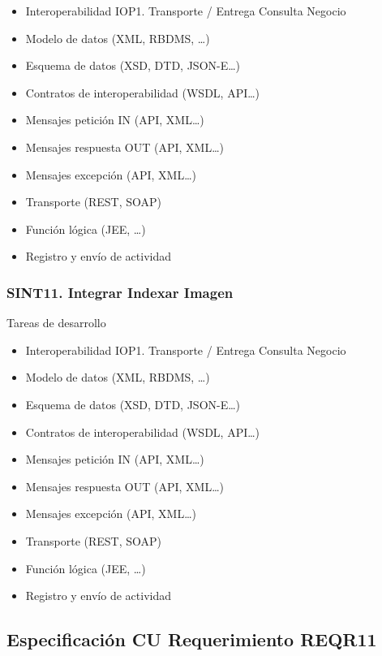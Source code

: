 \documentclass[
  paper=a4,
  ,captions=tableheading
]{scrartcl}
\providecommand{\tightlist}{%
  \setlength{\itemsep}{0pt}\setlength{\parskip}{0pt}}
\begin{document}
\begin{itemize}
\tightlist
\item
  Interoperabilidad IOP1. Transporte / Entrega Consulta Negocio
\item
  Modelo de datos (XML, RBDMS, \ldots)
\item
  Esquema de datos (XSD, DTD, JSON-E\ldots)
\item
  Contratos de interoperabilidad (WSDL, API\ldots)
\item
  Mensajes petición IN (API, XML\ldots)
\item
  Mensajes respuesta OUT (API, XML\ldots)
\item
  Mensajes excepción (API, XML\ldots)
\item
  Transporte (REST, SOAP)
\item
  Función lógica (JEE, \ldots)
\item
  Registro y envío de actividad
\end{itemize}

\subsubsection{SINT11. Integrar Indexar
Imagen}\label{sec:sint11.-integrar-indexar-imagen}

Tareas de desarrollo

\begin{itemize}
\tightlist
\item
  Interoperabilidad IOP1. Transporte / Entrega Consulta Negocio
\item
  Modelo de datos (XML, RBDMS, \ldots)
\item
  Esquema de datos (XSD, DTD, JSON-E\ldots)
\item
  Contratos de interoperabilidad (WSDL, API\ldots)
\item
  Mensajes petición IN (API, XML\ldots)
\item
  Mensajes respuesta OUT (API, XML\ldots)
\item
  Mensajes excepción (API, XML\ldots)
\item
  Transporte (REST, SOAP)
\item
  Función lógica (JEE, \ldots)
\item
  Registro y envío de actividad
\end{itemize}

\subsection{Especificación CU Requerimiento
REQR11}\label{sec:especificaciuxf3n-cu-requerimiento-reqr11}
\end{document}
